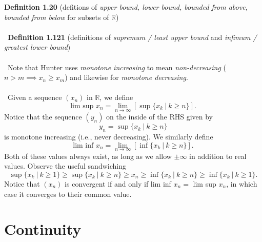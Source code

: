 \documentclass[12 pt]{article}
\newcommand{\R}{\mathbb{R}}
\numberwithin{equation}{section}
\begin{document}
{\textbf{Definition 1.20} (defitions of \textit{upper bound, lower bound, bounded from above, bounded from below} for subsets of $\R$)\\
\\
\
\textbf{Definition 1.121} (definitions of \textit{supremum / least upper bound} and \textit{infimum / greatest lower bound})\\
\\
\
Note that Hunter uses \textit{monotone increasing} to mean \textit{non-decreasing} ($n > m \implies x_n \geq x_m$) and likewise for \textit{monotone decreasing}.\\
\\
\
Given a sequence $(x_n)$ in $\R$, we define \begin{equation*}
\mbox{lim sup } x_n = \lim_{n \to \infty} \left[ \sup \{ x_k \ | \ k \geq n \} \right].
\end{equation*}
Notice that the sequence $(y_n)$ on the inside of the RHS given by \begin{equation*}
y_n = \sup \{ x_k \ | \ k \geq n \} 
\end{equation*}
is monotone increasing (i.e., never decreasing). We similarly define \begin{equation*}
\mbox{lim inf } x_n = \lim_{n \to \infty} \left[ \inf \{ x_k \ | \ k \geq n \} \right].
\end{equation*}
Both of these values always exist, as long as we allow $\pm \infty$ in addition to real values. Observe the useful sandwiching \begin{equation*}
\sup \{ x_k \ | \ k \geq 1 \} \geq \sup \{ x_k \ | \ k \geq n \}  \geq x_n \geq \inf \{ x_k \ | \ k \geq n \}  \geq \inf \{ x_k \ | \ k \geq 1 \} .
\end{equation*}
Notice that $(x_n)$ is convergent if and only if lim inf $ x_n = $ lim sup $x_n$, in which case it converges to their common value.
















\section{Continuity}

}
\end{document}
